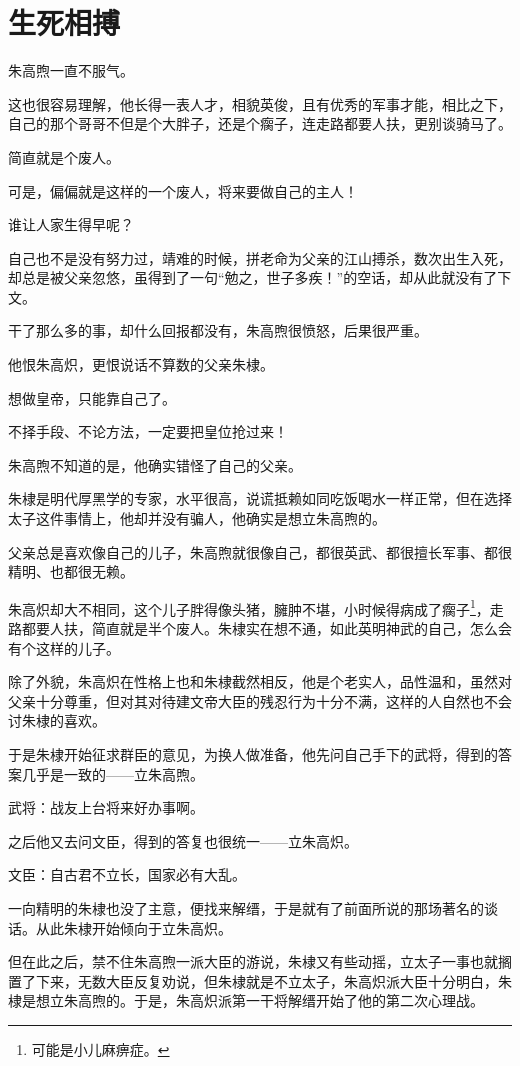 \section{生死相搏}
\ifnum{}
	\begin{multicols}{\theparacolNo}
\fi
朱高煦一直不服气。

这也很容易理解，他长得一表人才，相貌英俊，且有优秀的军事才能，相比之下，自己的那个哥哥不但是个大胖子，还是个瘸子，连走路都要人扶，更别谈骑马了。

简直就是个废人。

可是，偏偏就是这样的一个废人，将来要做自己的主人！

谁让人家生得早呢？

自己也不是没有努力过，靖难的时候，拼老命为父亲的江山搏杀，数次出生入死，却总是被父亲忽悠，虽得到了一句“勉之，世子多疾！”的空话，却从此就没有了下文。

干了那么多的事，却什么回报都没有，朱高煦很愤怒，后果很严重。

他恨朱高炽，更恨说话不算数的父亲朱棣。

想做皇帝，只能靠自己了。

不择手段、不论方法，一定要把皇位抢过来！

朱高煦不知道的是，他确实错怪了自己的父亲。

朱棣是明代厚黑学的专家，水平很高，说谎抵赖如同吃饭喝水一样正常，但在选择太子这件事情上，他却并没有骗人，他确实是想立朱高煦的。

父亲总是喜欢像自己的儿子，朱高煦就很像自己，都很英武、都很擅长军事、都很精明、也都很无赖。

朱高炽却大不相同，这个儿子胖得像头猪，臃肿不堪，小时候得病成了瘸子\footnote{可能是小儿麻痹症。}，走路都要人扶，简直就是半个废人。朱棣实在想不通，如此英明神武的自己，怎么会有个这样的儿子。

除了外貌，朱高炽在性格上也和朱棣截然相反，他是个老实人，品性温和，虽然对父亲十分尊重，但对其对待建文帝大臣的残忍行为十分不满，这样的人自然也不会讨朱棣的喜欢。

于是朱棣开始征求群臣的意见，为换人做准备，他先问自己手下的武将，得到的答案几乎是一致的——立朱高煦。

武将：战友上台将来好办事啊。

之后他又去问文臣，得到的答复也很统一——立朱高炽。

文臣：自古君不立长，国家必有大乱。

一向精明的朱棣也没了主意，便找来解缙，于是就有了前面所说的那场著名的谈话。从此朱棣开始倾向于立朱高炽。

但在此之后，禁不住朱高煦一派大臣的游说，朱棣又有些动摇，立太子一事也就搁置了下来，无数大臣反复劝说，但朱棣就是不立太子，朱高炽派大臣十分明白，朱棣是想立朱高煦的。于是，朱高炽派第一干将解缙开始了他的第二次心理战。


\end{multicols}
